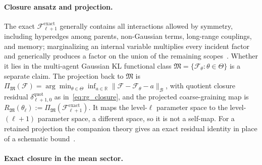 \paragraph{Closure ansatz and projection.}
The exact $\mathcal{F}_{\ell+1}^{\mathrm{exact}}$ generally contains all interactions allowed by symmetry, including hyperedges among parents, non-Gaussian terms, long-range couplings, and memory; marginalizing an internal variable multiplies every incident factor and generically produces a factor on the union of the remaining scopes~\cite[Ch.~11]{DennisGaugeVFE2026}. Whether it lies in the multi-agent Gaussian KL functional class $\mathfrak{M} = \{\mathcal{F}_\theta : \theta \in \Theta\}$ is a separate claim. The projection back to $\mathfrak{M}$ is $\Pi_\mathfrak{M}(\mathcal{F}) = \arg\min_{\theta \in \Theta} \inf_{a \in \mathbb{R}}\|\mathcal{F} - \mathcal{F}_\theta - a\|_\mathcal{B}$, with quotient closure residual $\delta_{\ell+1,0}^{\mathrm{quot}}$ as in~\eqref{eq:rg_closure}, and the projected coarse-graining map is $R_\mathfrak{M}(\theta_\ell) := \Pi_\mathfrak{M}(\mathcal{F}_{\ell+1}^{\mathrm{exact}})$. It maps the level-$\ell$ parameter space to the level-$(\ell+1)$ parameter space, a different space, so it is not a self-map. For a retained projection the companion theory gives an exact residual identity in place of a schematic bound~\cite[Ch.~11]{DennisGaugeVFE2026}.

\paragraph{Exact closure in the mean sector.}

